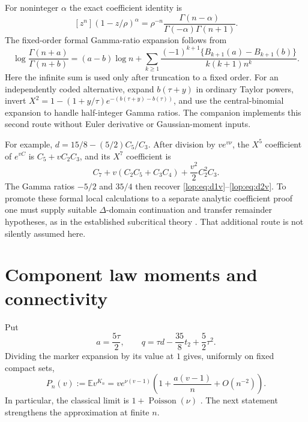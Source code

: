 \documentclass[11pt,letterpaper]{article}
\numberwithin{equation}{section}
\theoremstyle{remark}\newtheorem{remark}[theorem]{Remark}
\newcommand{\EE}{\mathbb E}
\newcommand{\Pois}{\operatorname{Poisson}}
\begin{document}
For noninteger $\alpha$ the exact coefficient identity is
\[
 [z^n](1-z/\rho)^\alpha
 =\rho^{-n}\frac{\Gamma(n-\alpha)}{\Gamma(-\alpha)\Gamma(n+1)}.
\]
The fixed-order formal Gamma-ratio expansion follows from
\[
 \log\frac{\Gamma(n+a)}{\Gamma(n+b)}
 =(a-b)\log n+
 \sum_{k\geq1}\frac{(-1)^{k+1}\{B_{k+1}(a)-B_{k+1}(b)\}}
                         {k(k+1)n^k}.
\]
Here the infinite sum is used only after truncation to a fixed order.
For an independently coded alternative, expand $b(\tau+y)$ in ordinary
Taylor powers, invert $X^2=1-(1+y/\tau)e^{-(b(\tau+y)-b(\tau))}$,
and use the central-binomial expansion to handle half-integer Gamma
ratios. The companion implements this second route without Euler
derivative or Gaussian-moment inputs.

For example, $d=15/8-(5/2)C_5/C_3$. After division by $ve^{v\nu}$,
the $X^5$ coefficient of $e^{vC}$ is $C_5+vC_2C_3$, and its $X^7$
coefficient is
\[
 C_7+v(C_2C_5+C_3C_4)+\frac{v^2}2C_2^2C_3.
\]
The Gamma ratios $-5/2$ and $35/4$ then recover
\eqref{lop:eq:d1v}--\eqref{lop:eq:d2v}. To promote these formal local calculations
to a separate analytic coefficient proof one must supply suitable
$\Delta$-domain continuation and transfer remainder hypotheses, as in
the established subcritical theory \cite{subcritical}. That additional
route is not silently assumed here.

\section{Component law moments and connectivity}\label{lop:sec:components}

Put
\begin{equation}\label{lop:eq:aq}
 a=\frac{5\tau}{2},\qquad
 q=\tau d-\frac{35}8t_2+\frac52\tau^2.
\end{equation}
Dividing the marker expansion by its value at $1$ gives, uniformly on
fixed compact sets,
\begin{equation}\label{lop:eq:pgffirst}
 P_n(v):=\EE v^{K_n}
 =ve^{\nu(v-1)}\left(1+\frac{a(v-1)}n+O(n^{-2})\right).
\end{equation}
In particular, the classical limit is $1+\Pois(\nu)$ \cite{bgkn}.
The next statement strengthens the approximation at finite $n$.
\end{document}
